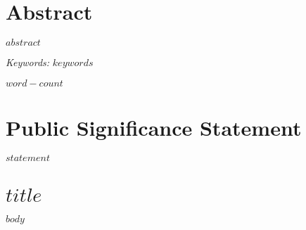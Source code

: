 \documentclass[12pt, letterpaper]{article}
\begin{document}
\section{Abstract}

\noindent $abstract$

\textit{Keywords:} $keywords$

\vfill

\begin{center}
\noindent $word-count$
\end{center}

\vfill

\section{Public Significance Statement}

\noindent $statement$

\newpage

\section{ $title$ }

$body$
\end{document}
